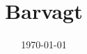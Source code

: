 

\title{Barvagt}
\date{\today}



\maketitle

\tableofcontents

\vspace{0.4cm}











\printindex


